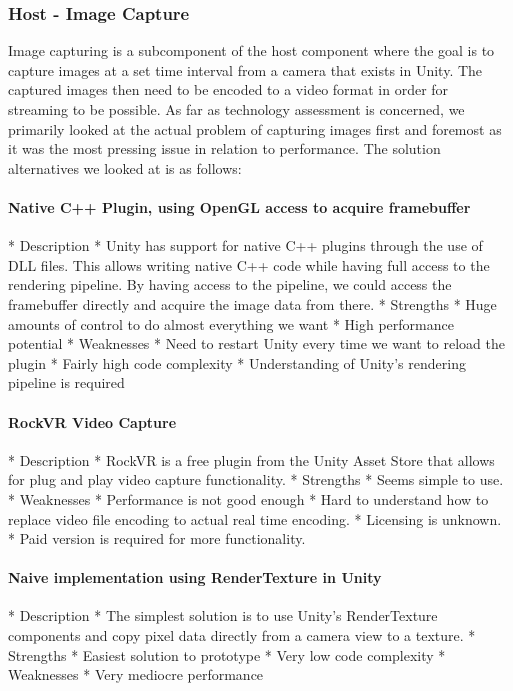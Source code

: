 \subsubsection{Host - Image Capture} %
Image capturing is a subcomponent of the host component where the goal is to capture images at a set time interval from a camera that exists in Unity. The captured images then need to be encoded to a video format in order for streaming to be possible. As far as technology assessment is concerned, we primarily looked at the actual problem of capturing images first and foremost as it was the most pressing issue in relation to performance. The solution alternatives we looked at is as follows:
\paragraph{Native C++ Plugin, using OpenGL access to acquire framebuffer}
        * Description
            * Unity has support for native C++ plugins through the use of DLL files. This allows writing native C++ code while having full access to the rendering pipeline. By having access to the pipeline, we could access the framebuffer directly and acquire the image data from there.   
        * Strengths
            * Huge amounts of control to do almost everything we want 
            * High performance potential
        * Weaknesses
            * Need to restart Unity every time we want to reload the plugin
            * Fairly high code complexity
            * Understanding of Unity's rendering pipeline is required
\paragraph{RockVR Video Capture}
        * Description
            * RockVR is a free plugin from the Unity Asset Store that allows for plug and play video capture functionality. 
        * Strengths
            * Seems simple to use. 
        * Weaknesses
            * Performance is not good enough
            * Hard to understand how to replace video file encoding to actual real time encoding.
            * Licensing is unknown. 
            * Paid version is required for more functionality. 
\paragraph{Naive implementation using RenderTexture in Unity}
        * Description
            * The simplest solution is to use Unity's RenderTexture components and copy pixel data directly from a camera view to a texture. 
        * Strengths
            * Easiest solution to prototype
            * Very low code complexity
        * Weaknesses
            * Very mediocre performance
